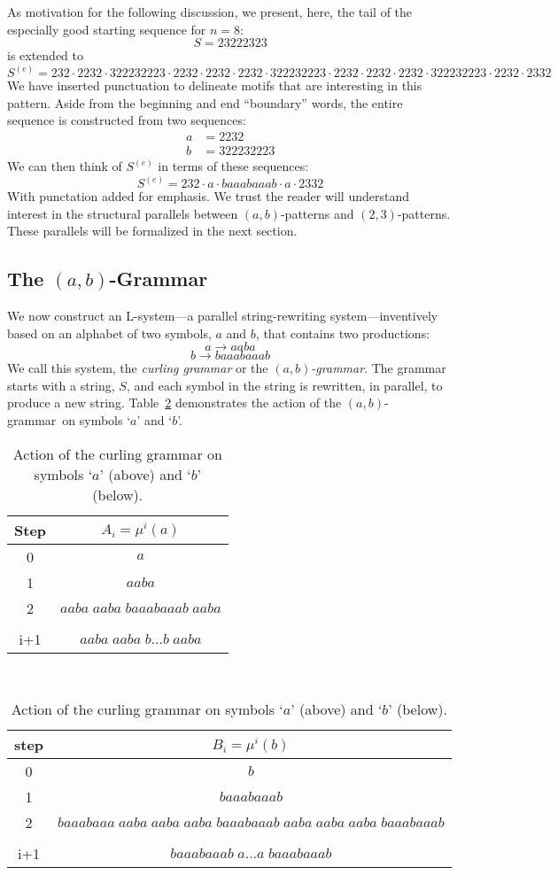\documentclass[11pt]{article}
\def\emph#1{{\em #1\/}}
\def\term#1{\emph{#1}}
\def\ni{\noindent}
\def\ab{$(a,b)$}
\def\twth{$(2,3)$}
\def\abg{\ab-grammar}
\def\q#1{`$#1$'}
\begin{document}
As motivation for the following discussion, we present, here, the tail
of the especially good starting sequence for $n=8$:
$$S=2 3 2 2 2 3 2 3$$
\ni is extended to
$$S^{(e)}=2 3 2 \cdot 2 2 3 2 \cdot 3 2 2 2 3 2 2 2 3\cdot2 2 3 2\cdot2 2 3 2\cdot2 2 3 2\cdot3 2 2 2 3 2 2 2 3\cdot 2 2 3 2 \cdot 2 2 3 2\cdot 2 2 3 2\cdot 3 2 2 2 3 2 2 2 3\cdot 2 2 3 2\cdot 2 3 3 2$$
\ni We have inserted punctuation to delineate motifs that are interesting in this pattern.  Aside from the beginning and end ``boundary'' words, the entire sequence is constructed from two sequences:
\begin{align*}
a&=2 2 3 2\\
b&=3 2 2 2 3 2 2 2 3
\end{align*}
\ni We can then think of $S^{(e)}$ in terms of these sequences:
$$S^{(e)}=232\cdot a\cdot b a a a b a a a b\cdot a \cdot 2332$$
With punctation added for emphasis.  We trust the reader will understand interest in the structural parallels between \ab-patterns and \twth-patterns.
These parallels will be formalized in the next section.

\subsection{The \ab-Grammar}

We now construct an L-system---a parallel string-rewriting system---inventively based on
an alphabet of two symbols, $a$ and $b$, that contains two productions:
$$a\rightarrow a a b a$$
$$b\rightarrow b a a a b a a a b$$
\ni We call this system, the \term{curling grammar} or the \term{\abg}.  The grammar starts with a string, $S$, and each symbol in the string
is rewritten, in parallel, to produce a new string.  Table~\ref{tab:deriv}
demonstrates the action of the \abg\ on symbols \q{a} and \q{b}.

\begin{table}
\begin{center}
\begin{tabular}{|c|c|}
\hline
Step & $A_i=\mu^i(a)$ \\\hline
0 & $a$\\
1 & $aaba$\\
2 & $aaba\;aaba\;baaabaaab\;aaba$\\
 &\\
i+1 &  $aaba\;aaba\;b...b\;aaba$ \\
\hline
\end{tabular}\\[0.1in]
\begin{tabular}{|c|c|}
\hline
step &$B_i=\mu^i(b)$\\\hline
0 & $b$\\
1 & $baaabaaab$\\
2& $baaabaaa\;aaba\;aaba\;aaba\;baaabaaab\;aaba\;aaba\;aaba\;baaabaaab$\\
&\\
i+1 & $baaabaaab\;a...a\;baaabaaab$\\
\hline
\end{tabular}
\end{center}
\caption{Action of the curling grammar on symbols \q{a} (above) and \q{b} (below).}

\label{tab:deriv}
\end{table}
\end{document}
